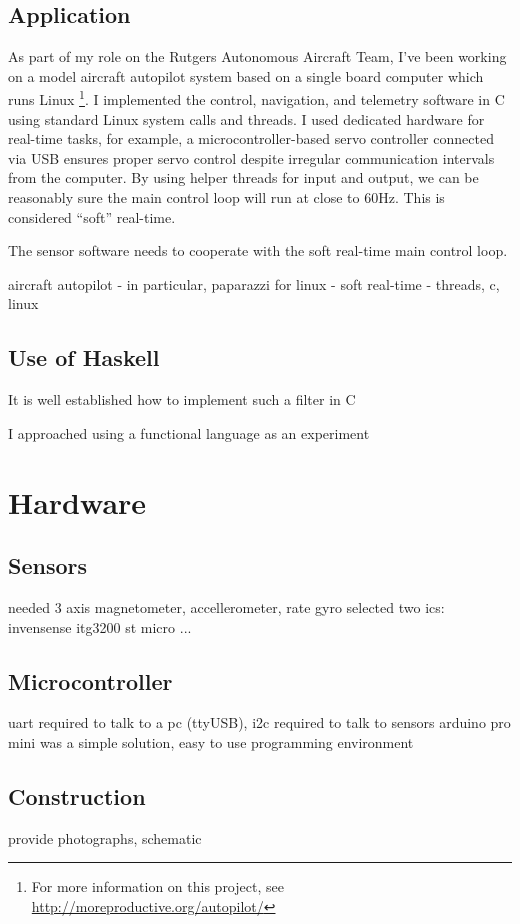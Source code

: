 \documentclass[12pt]{report}
\begin{document}
\subsection{Application}

As part of my role on the Rutgers Autonomous Aircraft Team, I've been working on a model aircraft autopilot system based on a single board computer which runs Linux \footnote{For more information on this project, see \url{http://moreproductive.org/autopilot/}}. I implemented the control, navigation, and telemetry software in C using standard Linux system calls and threads. I used dedicated hardware for real-time tasks, for example, a microcontroller-based servo controller connected via USB ensures proper servo control despite irregular communication intervals from the computer. 
By using helper threads for input and output, we can be reasonably sure the main control loop will run at close to 60Hz. This is considered ``soft'' real-time.

The sensor software needs to cooperate with the soft real-time main control loop. 



aircraft autopilot
- in particular, paparazzi for linux
- soft real-time
- threads, c, linux
\subsection{Use of Haskell}
It is well established how to implement such a filter in C

I approached using a functional language as an experiment

\section{Hardware}
\subsection{Sensors}
needed 3 axis magnetometer, accellerometer, rate gyro
selected two ics:
invensense itg3200
st micro ...
\subsection{Microcontroller}
uart required to talk to a pc (ttyUSB), i2c required to talk to sensors
arduino pro mini was a simple solution, easy to use programming environment
\subsection{Construction}
provide photographs, schematic
\end{document}
